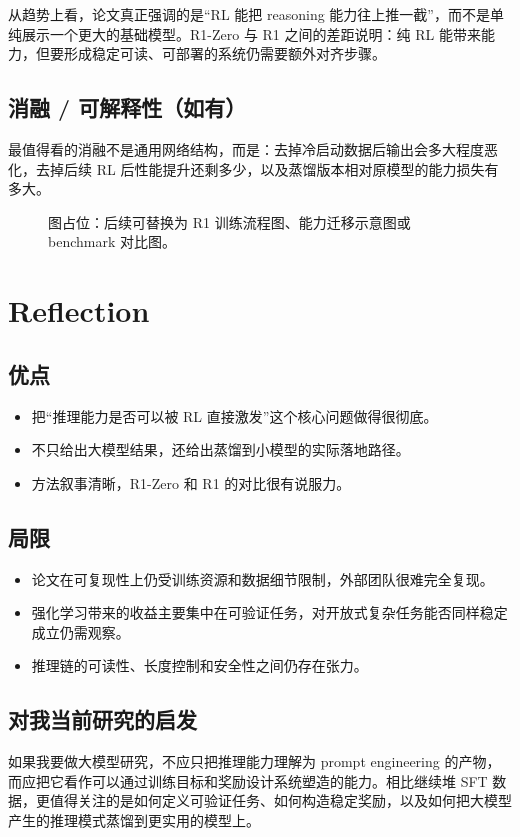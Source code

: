 \documentclass[UTF8,fontset=fandol,zihao=-4]{ctexart}
\begin{document}
从趋势上看，论文真正强调的是“RL 能把 reasoning 能力往上推一截”，而不是单纯展示一个更大的基础模型。R1-Zero 与 R1 之间的差距说明：纯 RL 能带来能力，但要形成稳定可读、可部署的系统仍需要额外对齐步骤。

\subsection{消融 / 可解释性（如有）}
最值得看的消融不是通用网络结构，而是：去掉冷启动数据后输出会多大程度恶化，去掉后续 RL 后性能提升还剩多少，以及蒸馏版本相对原模型的能力损失有多大。

\begin{figure}[H]
\centering
\fbox{\rule{0pt}{45mm}\rule{0.85\linewidth}{0pt}}
\caption{图占位：后续可替换为 R1 训练流程图、能力迁移示意图或 benchmark 对比图。}
\end{figure}

\section{Reflection}

\subsection{优点}
\begin{itemize}
  \item 把“推理能力是否可以被 RL 直接激发”这个核心问题做得很彻底。
  \item 不只给出大模型结果，还给出蒸馏到小模型的实际落地路径。
  \item 方法叙事清晰，R1-Zero 和 R1 的对比很有说服力。
\end{itemize}

\subsection{局限}
\begin{itemize}
  \item 论文在可复现性上仍受训练资源和数据细节限制，外部团队很难完全复现。
  \item 强化学习带来的收益主要集中在可验证任务，对开放式复杂任务能否同样稳定成立仍需观察。
  \item 推理链的可读性、长度控制和安全性之间仍存在张力。
\end{itemize}

\subsection{对我当前研究的启发}
如果我要做大模型研究，不应只把推理能力理解为 prompt engineering 的产物，而应把它看作可以通过训练目标和奖励设计系统塑造的能力。相比继续堆 SFT 数据，更值得关注的是如何定义可验证任务、如何构造稳定奖励，以及如何把大模型产生的推理模式蒸馏到更实用的模型上。
\end{document}
